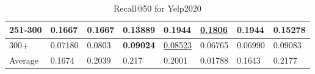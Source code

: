\begin{table*}[]
\begin{tabular}{|l|l|l|l|l|l|l||l|}
        251-300     & 0.1667                         & 0.1667                         & 0.13889                        & \textbf{0.1944}                & \underline{0.1806}             & \textbf{0.1944}                 & 0.15278                    \\ \hline
        300+        & 0.07180                        & 0.0803                         & \textbf{0.09024}               & \underline{0.08523}            & 0.06765                        & 0.06990                         & 0.09083                    \\ \hline
        Average     & 0.1674                         & 0.2039                         & 0.217                          & 0.2001                         & 0.01788                        & 0.1643                          & 0.2177                     \\ \hline
    \end{tabular}
    \caption{Recall@50 for Yelp2020}
    \label{tab:yelp2020-recall-evaluation}
\end{table*}


